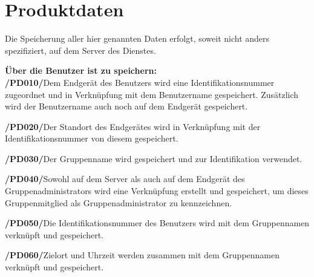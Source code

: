 \section{Produktdaten}

Die Speicherung aller hier genannten Daten erfolgt, soweit nicht anders spezifiziert, auf dem Server des Dienstes.

\textbf{Über die Benutzer ist zu speichern:}\\

\textbf{/PD010/}Dem Endgerät des Benutzers wird eine Identifikationsnummer zugeordnet und in Verknüpfung mit dem Benutzername gespeichert. Zusätzlich wird der
 Benutzername auch noch auf dem Endgerät gespeichert.

\textbf{/PD020/}Der Standort des Endgerätes wird in Verknüpfung mit der Identifikationsnummer von diesem gespeichert.

\textbf{/PD030/}Der Gruppenname wird gespeichert und zur Identifikation verwendet.

\textbf{/PD040/}Sowohl auf dem Server als auch auf dem Endgerät des Gruppenadministrators wird eine Verknüpfung erstellt und gespeichert, um dieses Gruppenmitglied als Gruppenadministrator zu kennzeichnen.

\textbf{/PD050/}Die Identifikationsnummer des Benutzers wird mit dem Gruppennamen verknüpft und gespeichert.

\textbf{/PD060/}Zielort und Uhrzeit werden zusammen mit dem Gruppennamen verknüpft und gespeichert.